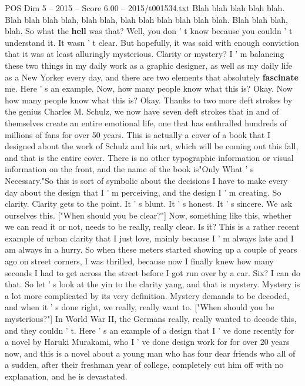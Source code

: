 \begin{textsample}{POS Dim 5 – 2015 – Score 6.00 – 2015/t001534.txt}  \label{ex:f5_pos_054}
Blah blah blah blah blah.
Blah blah blah blah, blah blah, blah blah blah blah blah blah.
Blah blah blah, blah.
So what the \textbf{hell} was that?
Well, you don ' t know because you couldn ' t understand it.
It wasn ' t clear.
But hopefully, it was said with enough conviction that it was at least alluringly mysterious.
Clarity or mystery?
I ' m balancing these two things in my daily work as a graphic designer, as well as my daily life as a New Yorker every day, and there are two elements that absolutely \textbf{fascinate} me.
Here ' s an example.
Now, how many people know what this is?
Okay.
Now how many people know what this is?
Okay.
Thanks to two more deft strokes by the genius Charles M.
Schulz, we now have seven deft strokes that in and of themselves create an entire emotional life, one that has enthralled hundreds of millions of fans for over 50 years.
This is actually a cover of a book that I designed about the work of Schulz and his art, which will be coming out this fall, and that is the entire cover.
There is no other typographic information or visual information on the front, and the name of the book is"Only What ' s Necessary."So this is sort of symbolic about the decisions I have to make every day about the design that I ' m perceiving, and the design I ' m creating.
So clarity.
Clarity gets to the point.
It ' s blunt.
It ' s honest.
It ' s sincere.
We ask ourselves this. ["When should you be clear?"] Now, something like this, whether we can read it or not, needs to be really, really clear.
Is it?
This is a rather recent example of urban clarity that I just love, mainly because I ' m always late and I am always in a hurry.
So when these meters started showing up a couple of years ago on street corners, I was thrilled, because now I finally knew how many seconds I had to get across the street before I got run over by a car.
Six?
I can do that.
So let ' s look at the yin to the clarity yang, and that is mystery.
Mystery is a lot more complicated by its very definition.
Mystery demands to be decoded, and when it ' s done right, we really, really want to. ["When should you be mysterious?"] In World War II, the Germans really, really wanted to decode this, and they couldn ' t.
Here ' s an example of a design that I ' ve done recently for a novel by Haruki Murakami, who I ' ve done design work for for over 20 years now, and this is a novel about a young man who has four dear friends who all of a sudden, after their freshman year of college, completely cut him off with no explanation, and he is devastated.

\end{textsample}
